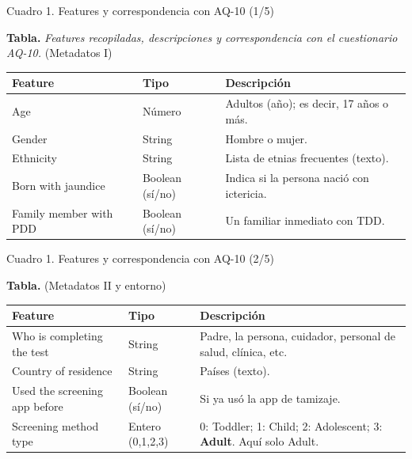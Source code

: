 \documentclass[11pt]{beamer}
\begin{document}
\begin{frame}{Cuadro 1. Features y correspondencia con AQ-10 (1/5)}
  \vspace{-0.2em}
  \begin{center}
    \scriptsize
    \textbf{Tabla.} \emph{Features recopiladas, descripciones y correspondencia con el cuestionario AQ-10.} (Metadatos I)
  \end{center}
  \vspace{0.2em}
  {\tiny
  \begin{tabularx}{\linewidth}{@{}l l L@{}}
    \toprule
    \textbf{Feature} & \textbf{Tipo} & \textbf{Descripción} \\
    \midrule
    Age & Número & Adultos (año); es decir, 17 años o más. \\
    Gender & String & Hombre o mujer. \\
    Ethnicity & String & Lista de etnias frecuentes (texto). \\
    Born with jaundice & Boolean (sí/no) & Indica si la persona nació con ictericia. \\
    Family member with PDD & Boolean (sí/no) & Un familiar inmediato con TDD. \\
    \bottomrule
  \end{tabularx}
  }
\end{frame}

\begin{frame}{Cuadro 1. Features y correspondencia con AQ-10 (2/5)}
  \vspace{-0.2em}
  \begin{center}
    \scriptsize
    \textbf{Tabla.} (Metadatos II y entorno)
  \end{center}
  \vspace{0.2em}
  {\tiny
  \begin{tabularx}{\linewidth}{@{}l l L@{}}
    \toprule
    \textbf{Feature} & \textbf{Tipo} & \textbf{Descripción} \\
    \midrule
    Who is completing the test & String & Padre, la persona, cuidador, personal de salud, clínica, etc. \\
    Country of residence & String & Países (texto). \\
    Used the screening app before & Boolean (sí/no) & Si ya usó la app de tamizaje. \\
    Screening method type & Entero (0,1,2,3) & 0: Toddler; 1: Child; 2: Adolescent; 3: \textbf{Adult}. Aquí solo Adult. \\
    \bottomrule
  \end{tabularx}
  }
\end{frame}
\end{document}
